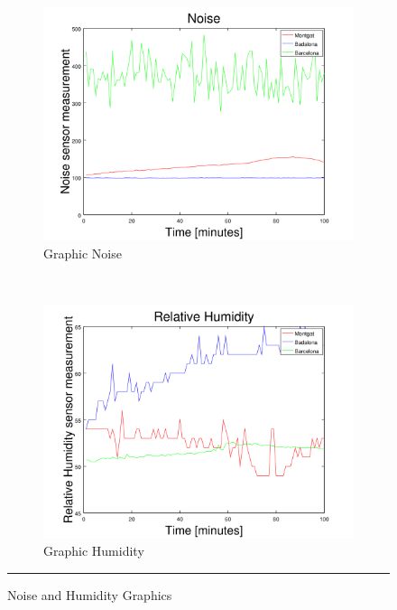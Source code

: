 \documentclass[12pt, a4paper,twoside]{tesi_upf}
\begin{document}
			\begin{figure}[H]
        \centering
        \begin{subfigure}[b]{0.49\textwidth}
                \includegraphics[width=\textwidth]{./Figures/GraphicNoise.png}
                \caption{Graphic Noise}
                \label{fig:GraphicNoise}
        \end{subfigure}%
        ~ %
        \begin{subfigure}[b]{0.49\textwidth}
                \includegraphics[width=\textwidth]{./Figures/GraphicHumidity.png}
                \caption{Graphic Humidity}
                \label{fig:GraphicHumidity}
        \end{subfigure}
        \rule{30em}{0.5pt}
        \caption{Noise and Humidity Graphics}\label{fig:TestbedResults1}
			\end{figure}
\end{document}

